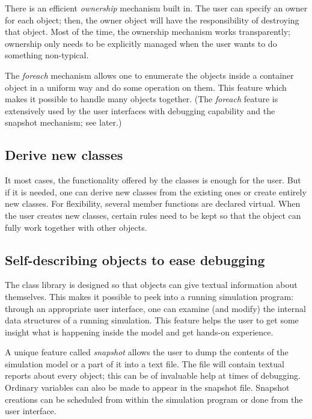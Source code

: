 There is an efficient \textit{ownership} mechanism
built in. The user can specify an owner for each object; then, the
owner object will have the responsibility of destroying that object.
Most of the time, the ownership mechanism works transparently;
ownership only needs to be explicitly managed when the user wants to
do something non-typical.


The \textit{foreach} mechanism allows one to
enumerate the objects inside a container object in a uniform way and
do some operation on them. This feature which makes it possible to
handle many objects together. (The \textit{foreach} feature is extensively used
by the user interfaces with debugging capability and the snapshot
mechanism; see later.)


\subsection{Derive new classes}

It most cases, the functionality offered by the {\opp} classes
is enough for the user. But if it is needed, one can derive new
classes from the existing ones or create entirely new classes.
For flexibility, several member functions are declared virtual.
When the user creates new classes, certain rules need to be kept
so that the object can fully work together with other objects.


\subsection{Self-describing objects to ease debugging}

The class library is designed so that objects can give textual
information about themselves. This makes it possible to peek
into a running simulation program: through an appropriate user
interface, one can examine (and modify) the internal data structures
of a running simulation. This feature helps the user to get some
insight what is happening inside the model and get hands-on experience.


A unique feature called \textit{snapshot} allows the
user to dump the contents of the simulation model or a part of it into
a text file. The file will contain textual reports about every object;
this can be of invaluable help at times of debugging. Ordinary
variables can also be made to appear in the snapshot file. Snapshot
creations can be scheduled from within the simulation program or done
from the user interface.



